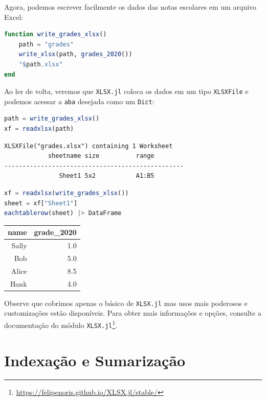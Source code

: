 \documentclass[
  notoc %
]{tufte-book}
\DeclareRobustCommand{\href}[2]{#2\footnote{\url{#1}}}
\newcommand{\passthrough}[1]{#1}
\begin{document}
Agora, podemos escrever facilmente os dados das notas escolares em um
arquivo Excel:

\begin{lstlisting}[language=Julia]
function write_grades_xlsx()
    path = "grades"
    write_xlsx(path, grades_2020())
    "$path.xlsx"
end
\end{lstlisting}

Ao ler de volta, veremos que \passthrough{\lstinline!XLSX.jl!} coloca os
dados em um tipo \passthrough{\lstinline!XLSXFile!} e podemos acessar a
\passthrough{\lstinline!aba!} desejada como um
\passthrough{\lstinline!Dict!}:

\begin{lstlisting}[language=Julia]
path = write_grades_xlsx()
xf = readxlsx(path)
\end{lstlisting}

\begin{lstlisting}[language=Output]
XLSXFile("grades.xlsx") containing 1 Worksheet
            sheetname size          range        
-------------------------------------------------
               Sheet1 5x2           A1:B5        

\end{lstlisting}

\begin{lstlisting}[language=Julia]
xf = readxlsx(write_grades_xlsx())
sheet = xf["Sheet1"]
eachtablerow(sheet) |> DataFrame
\end{lstlisting}

\begin{longtable}[]{@{}rr@{}}
\toprule
name & grade\_2020 \\
\midrule
\endhead
Sally & 1.0 \\
Bob & 5.0 \\
Alice & 8.5 \\
Hank & 4.0 \\
\bottomrule
\end{longtable}

Observe que cobrimos apenas o básico de
\passthrough{\lstinline!XLSX.jl!} mas usos mais poderosos e
customizações estão disponíveis. Para obter mais informações e opções,
consulte a
\href{https://felipenoris.github.io/XLSX.jl/stable/}{documentação do
módulo \passthrough{\lstinline!XLSX.jl!}}.

\hypertarget{indexauxe7uxe3o-e-sumarizauxe7uxe3o}{%
\section{Indexação e
Sumarização}\label{indexauxe7uxe3o-e-sumarizauxe7uxe3o}}
\end{document}
